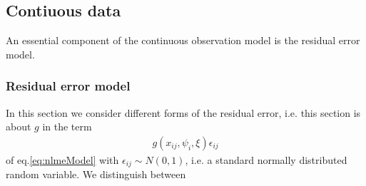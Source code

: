 \subsection{Contiuous data}
\label{subsec:ContinuesData}

An essential component of the continuous observation model is the residual error model.

\subsubsection{Residual error model}
\label{sec:residualErrorModel}
\label{maths:error_model}
\label{maths:combined-err-model}
In this section we consider different forms of the residual error, i.e. this section is about $g$ in the term
\begin{align*}
g(x_{ij}, \psi_{i}, \xi) \epsilon_{ij}
\end{align*}
of eq.\ref{eq:nlmeModel} with $\epsilon_{ij} \sim N(0, 1)$, i.e. a standard normally distributed random variable. We distinguish between
